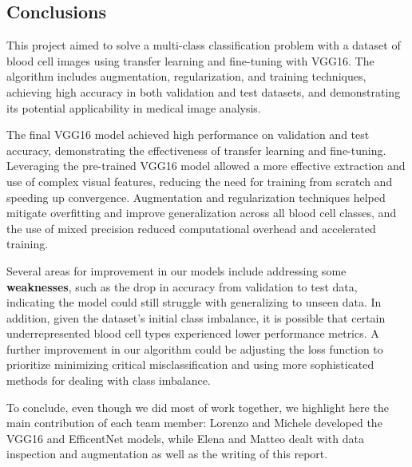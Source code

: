\documentclass[11pt]{article}
\begin{document}
\begin{multicols*}{2}
        \section{Conclusions}

        This project aimed to solve a multi-class classification problem with a dataset of blood cell images using transfer learning and fine-tuning with VGG16. The algorithm includes augmentation, regularization, and training techniques, achieving high accuracy in both validation and test datasets, and demonstrating its potential applicability in medical image analysis.

        
        The final VGG16 model achieved high performance on validation and test accuracy, demonstrating the effectiveness of transfer learning and fine-tuning. Leveraging the pre-trained VGG16 model allowed a more effective extraction and use of complex visual features, reducing the need for training from scratch and speeding up convergence. Augmentation and regularization techniques helped mitigate overfitting and improve generalization across all blood cell classes, and the use of mixed precision reduced computational overhead and accelerated training. 
        
        Several areas for improvement in our models include addressing some \textbf{weaknesses}, such as the drop in accuracy from validation to test data, indicating the model could still struggle with generalizing to unseen data. In addition, given the dataset's initial class imbalance, it is possible that certain underrepresented blood cell types experienced lower performance metrics. A further improvement in our algorithm could be adjusting the loss function to prioritize minimizing critical misclassification and using more sophisticated methods for dealing with class imbalance.

        To conclude, even though we did most of work together, we highlight here the main contribution of each team member: Lorenzo and Michele developed the VGG16 and EfficentNet models, while Elena and Matteo dealt with data inspection and augmentation as well as the writing of this report.

        
        
        
    
    \end{multicols*}
\end{document}
